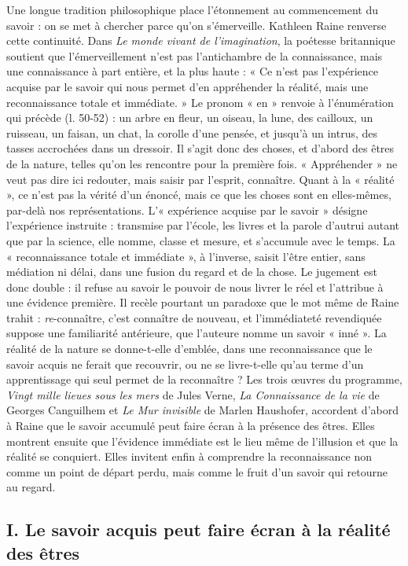 \documentclass[11pt,a4paper]{article}
\begin{document}
Une longue tradition philosophique place l'étonnement au commencement du savoir : on se met à chercher parce qu'on s'émerveille. Kathleen Raine renverse cette continuité. Dans \emph{Le monde vivant de l'imagination}, la poétesse britannique soutient que l'émerveillement n'est pas l'antichambre de la connaissance, mais une connaissance à part entière, et la plus haute : « Ce n'est pas l'expérience acquise par le savoir qui nous permet d'en appréhender la réalité, mais une reconnaissance totale et immédiate. » Le pronom « en » renvoie à l'énumération qui précède (l. 50-52) : un arbre en fleur, un oiseau, la lune, des cailloux, un ruisseau, un faisan, un chat, la corolle d'une pensée, et jusqu'à un intrus, des tasses accrochées dans un dressoir. Il s'agit donc des choses, et d'abord des êtres de la nature, telles qu'on les rencontre pour la première fois. « Appréhender » ne veut pas dire ici redouter, mais saisir par l'esprit, connaître. Quant à la « réalité », ce n'est pas la vérité d'un énoncé, mais ce que les choses sont en elles-mêmes, par-delà nos représentations. L'« expérience acquise par le savoir » désigne l'expérience instruite : transmise par l'école, les livres et la parole d'autrui autant que par la science, elle nomme, classe et mesure, et s'accumule avec le temps. La « reconnaissance totale et immédiate », à l'inverse, saisit l'être entier, sans médiation ni délai, dans une fusion du regard et de la chose. Le jugement est donc double : il refuse au savoir le pouvoir de nous livrer le réel et l'attribue à une évidence première. Il recèle pourtant un paradoxe que le mot même de Raine trahit : \emph{re}-connaître, c'est connaître de nouveau, et l'immédiateté revendiquée suppose une familiarité antérieure, que l'auteure nomme un savoir « inné ». La réalité de la nature se donne-t-elle d'emblée, dans une reconnaissance que le savoir acquis ne ferait que recouvrir, ou ne se livre-t-elle qu'au terme d'un apprentissage qui seul permet de la reconnaître ? Les trois œuvres du programme, \emph{Vingt mille lieues sous les mers} de Jules Verne, \emph{La Connaissance de la vie} de Georges Canguilhem et \emph{Le Mur invisible} de Marlen Haushofer, accordent d'abord à Raine que le savoir accumulé peut faire écran à la présence des êtres. Elles montrent ensuite que l'évidence immédiate est le lieu même de l'illusion et que la réalité se conquiert. Elles invitent enfin à comprendre la reconnaissance non comme un point de départ perdu, mais comme le fruit d'un savoir qui retourne au regard.

\hypertarget{i.-le-savoir-acquis-peut-faire-uxe9cran-uxe0-la-ruxe9alituxe9-des-uxeatres}{%
\subsection{I. Le savoir acquis peut faire écran à la réalité des êtres}\label{i.-le-savoir-acquis-peut-faire-uxe9cran-uxe0-la-ruxe9alituxe9-des-uxeatres}}
\end{document}
